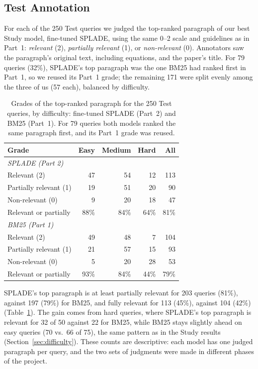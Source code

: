 \documentclass[sigconf,nonacm]{acmart}
\begin{document}
\subsection{Test Annotation}
\label{sec:annotation}

For each of the 250 Test queries we judged the top-ranked paragraph of our
best Study model, fine-tuned SPLADE, using the same 0--2 scale and
guidelines as in Part~1: \textit{relevant} (2), \textit{partially relevant}
(1), or \textit{non-relevant} (0). Annotators saw the paragraph's original
text, including equations, and the paper's title. For 79 queries (32\%),
SPLADE's top paragraph was the one BM25 had ranked first in Part~1, so we
reused its Part~1 grade; the remaining 171 were split evenly among the three
of us (57 each), balanced by difficulty. 

\begin{table}[t]
  \caption{Grades of the top-ranked paragraph for the 250 Test queries,
    by difficulty: fine-tuned SPLADE (Part~2) and BM25 (Part~1). For 79
    queries both models ranked the same paragraph first, and its Part~1
    grade was reused.}
  \label{tab:annotation}
  \small
  \begin{tabular}{lrrrr}
    \toprule
    Grade & Easy & Medium & Hard & All \\
    \midrule
    \multicolumn{5}{l}{\textit{SPLADE (Part 2)}} \\
    Relevant (2)           & 47 & 54 & 12 & 113 \\
    Partially relevant (1) & 19 & 51 & 20 &  90 \\
    Non-relevant (0)       &  9 & 20 & 18 &  47 \\
    Relevant or partially  & 88\% & 84\% & 64\% & 81\% \\
    \midrule
    \multicolumn{5}{l}{\textit{BM25 (Part 1)}} \\
    Relevant (2)           & 49 & 48 &  7 & 104 \\
    Partially relevant (1) & 21 & 57 & 15 &  93 \\
    Non-relevant (0)       &  5 & 20 & 28 &  53 \\
    Relevant or partially  & 93\% & 84\% & 44\% & 79\% \\
    \bottomrule
  \end{tabular}
\end{table}

SPLADE's top paragraph is at least partially relevant for 203 queries (81\%),
against 197 (79\%) for BM25, and fully relevant for 113 (45\%), against 104
(42\%) (Table~\ref{tab:annotation}). The gain comes from hard queries, where
SPLADE's top paragraph is relevant for 32 of 50 against 22 for BM25, while
BM25 stays slightly ahead on easy queries (70 vs.\ 66 of 75), the same
pattern as in the Study results (Section~\ref{sec:difficulty}). These counts
are descriptive: each model has one judged paragraph per query, and the two
sets of judgments were made in different phases of the project.
\end{document}

